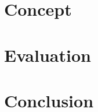 \section{Concept}\label{sec:concept}

\section{Evaluation}\label{sec:evaluation}

\section{Conclusion}\label{sec:conclusion}
